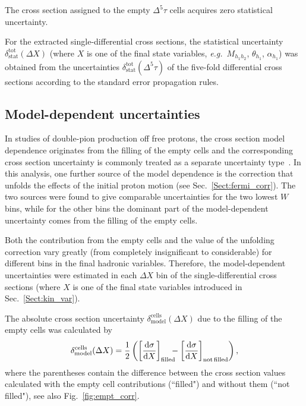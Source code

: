 \documentclass[prc,twocolumn,superscriptaddress,showpacs,amssymb,amsmath,amsfonts,aps,nofootinbib]{revtex4-1}
\begin{document}
The cross section assigned to the empty $\Delta^{5} \tau$ cells acquires zero statistical uncertainty.


For the extracted  single-differential cross sections, the statistical uncertainty $\delta_{\text{stat}}^{\text{tot}}(\Delta X)$ (where $X$ is one of the final state variables, {\it e.g.}~$M_{h_{1}h_{2}}$, $\theta_{h_1}$, $\alpha_{h_1}$) was obtained from the uncertainties  $\delta_{\text{stat}}^{\text{tot}}(\Delta^{5} \tau)$ of the five-fold differential cross sections according to the standard error propagation rules.



\subsection{Model-dependent uncertainties}
\label{Sect:mod_dep}


In studies of double-pion production off free protons, the cross section model dependence originates from the filling of the empty cells and the corresponding cross section uncertainty is commonly treated as a separate uncertainty type~\cite{Rip_an_note:2002,Ripani:2002ss,Fed_an_note:2007,Fedotov:2008aa,Isupov:2017lnd,Arjun,Fed_an_note:2017,Fed_paper_2018}. In this analysis, one further source of the model dependence is the correction that unfolds the effects of the initial proton motion (see Sec.\!~\ref{Sect:fermi_corr}). The two sources were found to give comparable uncertainties for the two lowest $W$ bins, while for the other bins the dominant part of the model-dependent uncertainty comes from the filling of the empty cells.

Both the contribution from the empty cells and the value of the unfolding correction vary greatly (from completely insignificant to considerable) for different bins in the final hadronic variables. Therefore, the model-dependent uncertainties were estimated in each $\Delta X$ bin of the single-differential cross sections (where $X$ is one of the final state variables introduced in Sec.\!~\ref{Sect:kin_var}).


The absolute cross section uncertainty $\delta^{\text{cells}}_{\text{model}}(\Delta X)$ due to the filling of the empty cells was calculated by\vspace{-0.5em}
\begin{equation}
\delta^{\text{cells}}_{\text{model}} (\Delta X) = \frac{1}{2}\left ( \left [ \frac{\textrm{d}\sigma}{\textrm{d}X} \right ]_{\text{filled}}\!\!\!\! - \left [\frac{\textrm{d}\sigma}{\textrm{d}X} \right ]_{\text{not~\!filled}}\!~\!\right ),
\label{eq:error_mod_abs}
\end{equation}
where the parentheses contain the difference between the cross section values calculated with the empty cell contributions (``filled") and without them (``not filled"), see also Fig.\!~\ref{fig:empt_corr}.
\end{document}
